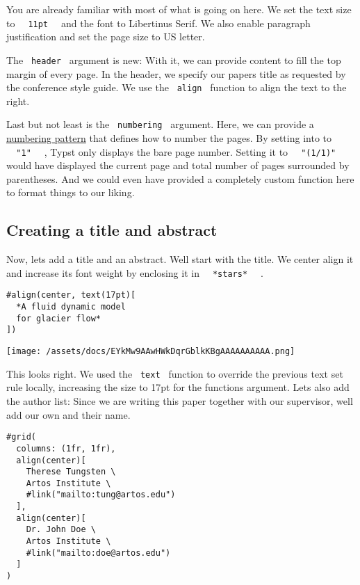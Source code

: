 You are already familiar with most of what is going on here. We set the
text size to \texttt{\ }{\texttt{\ 11pt\ }}\texttt{\ } and the font to
Libertinus Serif. We also enable paragraph justification and set the
page size to US letter.

The \texttt{\ header\ } argument is new: With it, we can provide content
to fill the top margin of every page. In the header, we specify our
paper\textquotesingle s title as requested by the conference style
guide. We use the \texttt{\ align\ } function to align the text to the
right.

Last but not least is the \texttt{\ numbering\ } argument. Here, we can
provide a \href{/docs/reference/model/numbering/}{numbering pattern}
that defines how to number the pages. By setting into to
\texttt{\ }{\texttt{\ "1"\ }}\texttt{\ } , Typst only displays the bare
page number. Setting it to \texttt{\ }{\texttt{\ "(1/1)"\ }}\texttt{\ }
would have displayed the current page and total number of pages
surrounded by parentheses. And we could even have provided a completely
custom function here to format things to our liking.

\subsection{Creating a title and abstract}\label{title-and-abstract}

Now, let\textquotesingle s add a title and an abstract.
We\textquotesingle ll start with the title. We center align it and
increase its font weight by enclosing it in
\texttt{\ }{\texttt{\ *stars*\ }}\texttt{\ } .

\begin{verbatim}
#align(center, text(17pt)[
  *A fluid dynamic model
  for glacier flow*
])
\end{verbatim}

\texttt{[image: /assets/docs/EYkMw9AAwHWkDqrGblkKBgAAAAAAAAAA.png]}

This looks right. We used the \texttt{\ text\ } function to override the
previous text set rule locally, increasing the size to 17pt for the
function\textquotesingle s argument. Let\textquotesingle s also add the
author list: Since we are writing this paper together with our
supervisor, we\textquotesingle ll add our own and their name.

\begin{verbatim}
#grid(
  columns: (1fr, 1fr),
  align(center)[
    Therese Tungsten \
    Artos Institute \
    #link("mailto:tung@artos.edu")
  ],
  align(center)[
    Dr. John Doe \
    Artos Institute \
    #link("mailto:doe@artos.edu")
  ]
)
\end{verbatim}

